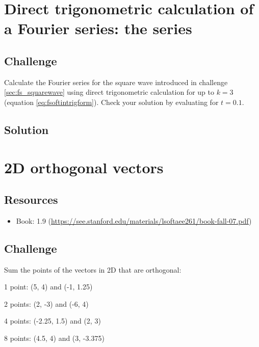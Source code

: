 \timebox




\newpage
\section{Direct trigonometric calculation of a Fourier series: the series}

\subsection*{Challenge}
Calculate the Fourier series for the square wave introduced in challenge \ref{sec:fs_squarewave} using direct trigonometric calculation for up to $k=3$ (equation \ref{eq:fsoftintrigform}). Check your solution by evaluating for $t=0.1$.

\subsection*{Solution}
\six{}


\timebox




\newpage
\section{2D orthogonal vectors}

\subsection*{Resources}
\begin{itemize}
    \item Book: 1.9 (\url{https://see.stanford.edu/materials/lsoftaee261/book-fall-07.pdf})
\end{itemize}

\subsection*{Challenge}
Sum the points of the vectors in 2D that are orthogonal:

1 point: (5, 4) and (-1, 1.25)

2 points:  (2, -3) and (-6, 4)

4 points: (-2.25, 1.5) and (2, 3)

8 points: (4.5, 4) and (3, -3.375)

